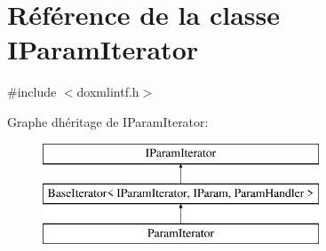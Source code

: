 \hypertarget{class_i_param_iterator}{}\section{Référence de la classe I\+Param\+Iterator}
\label{class_i_param_iterator}


{\ttfamily \#include $<$doxmlintf.\+h$>$}

Graphe d\textquotesingle{}héritage de I\+Param\+Iterator\+:\begin{figure}[H]
\begin{center}
\leavevmode
\includegraphics[height=3.000000cm]{class_i_param_iterator}
\end{center}
\end{figure}
